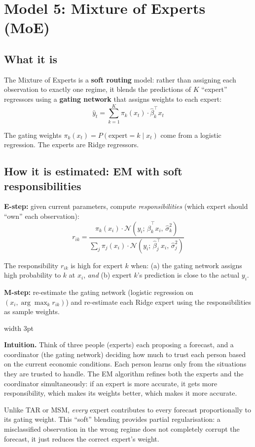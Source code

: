 \documentclass[11pt, a4paper]{article}
\newenvironment{intubox}{%
  \vspace{4pt}\par\noindent%
  {\color{darkblue}\vrule width 3pt}\hspace{6pt}%
  \begin{minipage}{\dimexpr\linewidth-9pt\relax}\vspace{2pt}%
}{%
  \vspace{2pt}\end{minipage}\par\vspace{4pt}%
}
\begin{document}
\section{Model 5: Mixture of Experts (MoE)}

\subsection{What it is}

The Mixture of Experts is a \textbf{soft routing} model: rather than assigning
each observation to exactly one regime, it blends the predictions of $K$
``expert'' regressors using a \textbf{gating network} that assigns weights to
each expert:
\[
  \hat{y}_t = \sum_{k=1}^K \pi_k(x_t)\cdot\hat\beta_k^\top x_t
\]

The gating weights $\pi_k(x_t) = P(\text{expert}=k\mid x_t)$ come from a
logistic regression. The experts are Ridge regressors.

\subsection{How it is estimated: EM with soft responsibilities}

\textbf{E-step:} given current parameters, compute \emph{responsibilities}
(which expert should ``own'' each observation):
\[
  r_{ik} = \frac{\pi_k(x_i)\cdot\mathcal{N}(y_i;\,\hat\beta_k^\top x_i,\,\hat\sigma_k^2)}
              {\sum_j \pi_j(x_i)\cdot\mathcal{N}(y_i;\,\hat\beta_j^\top x_i,\,\hat\sigma_j^2)}
\]

The responsibility $r_{ik}$ is high for expert $k$ when: (a) the gating
network assigns high probability to $k$ at $x_i$, \emph{and} (b) expert $k$'s
prediction is close to the actual $y_i$.

\textbf{M-step:} re-estimate the gating network (logistic regression on
$(x_i, \arg\max_k r_{ik})$) and re-estimate each Ridge expert using the
responsibilities as sample weights.

\begin{intubox}
\textbf{Intuition.}
Think of three people (experts) each proposing a forecast, and a coordinator
(the gating network) deciding how much to trust each person based on the current
economic conditions. Each person learns only from the situations they are trusted
to handle. The EM algorithm refines both the experts and the coordinator
simultaneously: if an expert is more accurate, it gets more responsibility,
which makes its weights better, which makes it more accurate.

Unlike TAR or MSM, \emph{every} expert contributes to every forecast
proportionally to its gating weight. This ``soft'' blending provides partial
regularisation: a misclassified observation in the wrong regime does not
completely corrupt the forecast, it just reduces the correct expert's weight.
\end{intubox}
\end{document}
